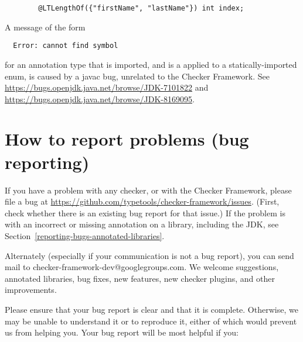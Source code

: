 \begin{Verbatim}
        @LTLengthOf({"firstName", "lastName"}) int index;
\end{Verbatim}

A message of the form

\begin{Verbatim}
  Error: cannot find symbol
\end{Verbatim}

\noindent
for an annotation type that is imported, and is a applied to a
statically-imported enum, is caused by a javac bug, unrelated to the
Checker Framework.  See
\url{https://bugs.openjdk.java.net/browse/JDK-7101822} and \url{https://bugs.openjdk.java.net/browse/JDK-8169095}.

\section{How to report problems (bug reporting)\label{reporting-bugs}}

If you have a problem with any checker, or with the Checker Framework,
please file a bug at
\url{https://github.com/typetools/checker-framework/issues}.
(First, check whether there is an existing bug report for that issue.)
If the problem is with an incorrect or missing annotation on a library,
including the JDK, see Section~\ref{reporting-bugs-annotated-libraries}.

Alternately (especially if your communication is not a bug report), you can
send mail to checker-framework-dev@googlegroups.com.
We welcome suggestions, annotated libraries, bug fixes, new
features, new checker plugins, and other improvements.

Please ensure that your bug report is clear and that it is complete.
Otherwise, we may be unable to understand it or to reproduce it, either of
which would prevent us from helping you.  Your bug report will be most
helpful if you:

